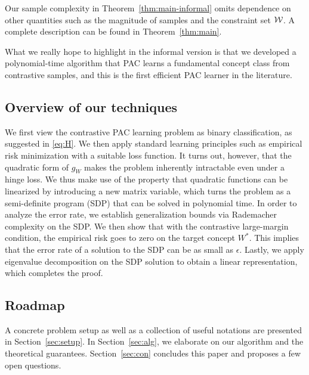 Our sample complexity in Theorem~\ref{thm:main-informal} omits dependence on other quantities such as the magnitude of samples and the constraint set $\mathcal{W}$. A complete description can be found in Theorem~\ref{thm:main}.

What we really hope to highlight in the informal version is that we developed a polynomial-time algorithm that PAC learns a fundamental concept class from contrastive samples, and this is the first efficient PAC learner in the literature.

\subsection{Overview of our techniques}

We first view the contrastive PAC learning problem as binary classification, as suggested in \eqref{eq:H}. We then apply standard learning principles such as empirical risk minimization with a suitable loss function. It turns out, however, that the quadratic form of $g_W$ makes the problem inherently intractable even under a hinge loss. We thus make use of the property that quadratic functions can be linearized by introducing a new matrix variable, which turns the problem as a semi-definite program (SDP) that can be solved in polynomial time. In order to analyze the error rate, we establish generalization bounds via Rademacher complexity on the SDP. We then show that with the contrastive large-margin condition, the empirical risk goes to zero on the target concept $W^*$. This implies that the error rate of a solution to the SDP can be as small as $\epsilon$. Lastly, we apply eigenvalue decomposition on the SDP solution to obtain a linear representation, which completes the proof.

\subsection{Roadmap}

A concrete problem setup as well as a collection of useful notations are presented in Section~\ref{sec:setup}. In Section~\ref{sec:alg}, we elaborate on our algorithm and the theoretical guarantees. Section~\ref{sec:con} concludes this paper and proposes a few open questions.

